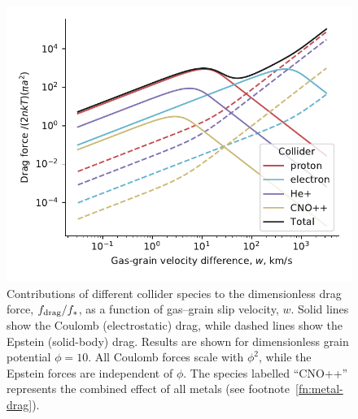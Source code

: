 \begin{figure}
  \includegraphics[width=\linewidth]{figs/test-Fdrag-components}
  \caption{Contributions of different collider species to the
    dimensionless drag force, \(f_{\text{drag}} / f_*\), as a function of
    gas--grain slip velocity, \(w\).  Solid lines show the Coulomb
    (electrostatic) drag, while dashed lines show the Epstein
    (solid-body) drag.  Results are shown for dimensionless grain
    potential \(\phi = 10\).  All Coulomb forces scale with
    \(\phi^2\), while the Epstein forces are independent of \(\phi\).  The
    species labelled ``CNO++'' represents the combined effect of all
    metals (see footnote~\ref{fn:metal-drag}).}
  \label{fig:drag-components}
\end{figure}


